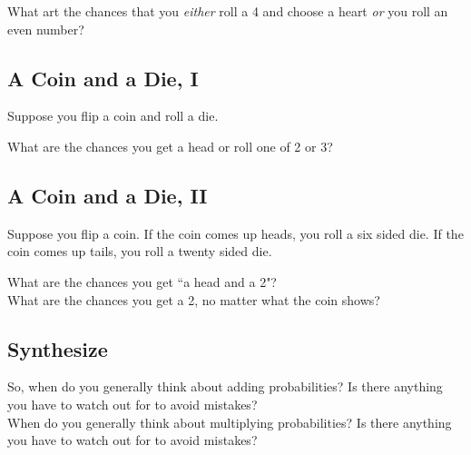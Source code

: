 \documentclass[12pt]{amsart}
\theoremstyle{definition}
\begin{document}
What art the chances that you \emph{either} roll a 4 and choose a heart \emph{or} you roll an even number?\\

\subsection*{A Coin and a Die, I} Suppose you flip a coin and roll a die. 

What are the chances you get a head or roll one of 2 or 3?\\

\subsection*{A Coin and a Die, II} Suppose you flip a coin. If the coin comes up heads, you roll a six sided die. If the coin comes up tails, you roll a twenty sided die.

What are the chances you get ``a head and a 2"?\\

What are the chances you get a 2, no matter what the coin shows?\\

\subsection*{Synthesize}
So, when do you generally think about adding probabilities? Is there anything you have to watch out for to avoid mistakes?\\

When do you generally think about multiplying probabilities? Is there anything you have to watch out for to avoid mistakes?\\
\end{document}
